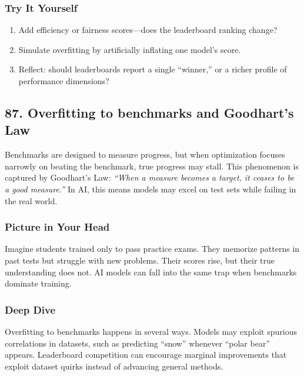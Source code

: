\documentclass[
  letterpaper,
  DIV=11,
  numbers=noendperiod]{scrreprt}
\providecommand{\tightlist}{%
  \setlength{\itemsep}{0pt}\setlength{\parskip}{0pt}}
\begin{document}
\subsubsection{Try It Yourself}\label{try-it-yourself-85}

\begin{enumerate}
\def\labelenumi{\arabic{enumi}.}
\tightlist
\item
  Add efficiency or fairness scores---does the leaderboard ranking
  change?
\item
  Simulate overfitting by artificially inflating one model's score.
\item
  Reflect: should leaderboards report a single ``winner,'' or a richer
  profile of performance dimensions?
\end{enumerate}

\subsection{87. Overfitting to benchmarks and Goodhart's
Law}\label{overfitting-to-benchmarks-and-goodharts-law}

Benchmarks are designed to measure progress, but when optimization
focuses narrowly on beating the benchmark, true progress may stall. This
phenomenon is captured by Goodhart's Law: \emph{``When a measure becomes
a target, it ceases to be a good measure.''} In AI, this means models
may excel on test sets while failing in the real world.

\subsubsection{Picture in Your Head}\label{picture-in-your-head-86}

Imagine students trained only to pass practice exams. They memorize
patterns in past tests but struggle with new problems. Their scores
rise, but their true understanding does not. AI models can fall into the
same trap when benchmarks dominate training.

\subsubsection{Deep Dive}\label{deep-dive-86}

Overfitting to benchmarks happens in several ways. Models may exploit
spurious correlations in datasets, such as predicting ``snow'' whenever
``polar bear'' appears. Leaderboard competition can encourage marginal
improvements that exploit dataset quirks instead of advancing general
methods.
\end{document}
